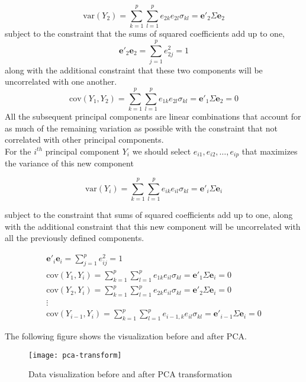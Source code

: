 \begin{equation}
\text{var}(Y_2) = \sum_{k=1}^{p}\sum_{l=1}^{p}e_{2k}e_{2l}\sigma_{kl} = \mathbf{e}'_2\Sigma\mathbf{e}_2
\end{equation}
subject to the constraint that the sums of squared coefficients add up to one,
\begin{equation}
\mathbf{e}'_2\mathbf{e}_2 = \sum_{j=1}^{p}e^2_{2j} = 1
\end{equation}
along with the additional constraint that these two components will be uncorrelated with one another.
\begin{equation}
\text{cov}(Y_1, Y_2) = \sum_{k=1}^{p}\sum_{l=1}^{p}e_{1k}e_{2l}\sigma_{kl} = \mathbf{e}'_1\Sigma\mathbf{e}_2 = 0
\end{equation}
All the subsequent principal components are linear combinations that account for as much of the remaining variation as possible with the constraint that not correlated with other principal components.\\
For the $ i^{th} $ principal component $ Y_i $ we should select $ e_{i1}, e_{i2}, \dots, e_{ip} $ that maximizes the variance of this new component

\begin{equation}
\text{var}(Y_i) = \sum_{k=1}^{p}\sum_{l=1}^{p}e_{ik}e_{il}\sigma_{kl} = \mathbf{e}'_i\Sigma\mathbf{e}_i
\end{equation}

subject to the constraint that sums of squared coefficients add up to one, along with the additional constraint that this new component will be uncorrelated with all the previously defined components.

\begin{gather*}
\mathbf{e}'_i\mathbf{e}_i = \sum_{j=1}^{p}e^2_{ij} = 1\\
\text{cov}(Y_1, Y_i) = \sum_{k=1}^{p}\sum_{l=1}^{p}e_{1k}e_{il}\sigma_{kl} = \mathbf{e}'_1\Sigma\mathbf{e}_i = 0\\
\text{cov}(Y_2, Y_i) = \sum_{k=1}^{p}\sum_{l=1}^{p}e_{2k}e_{il}\sigma_{kl} = \mathbf{e}'_2\Sigma\mathbf{e}_i = 0\\
\vdots\\
\text{cov}(Y_{i-1}, Y_i) = \sum_{k=1}^{p}\sum_{l=1}^{p}e_{i-1,k}e_{il}\sigma_{kl} = \mathbf{e}'_{i-1}\Sigma\mathbf{e}_i = 0
\end{gather*}

The following figure shows the visualization before and after PCA.
\begin{figure}[h]
	\centering
	\texttt{[image: pca-transform]}
	\caption{Data visualization before and after PCA transformation\cite{6_tan_steinbach_kumar_2005}}
\end{figure}


